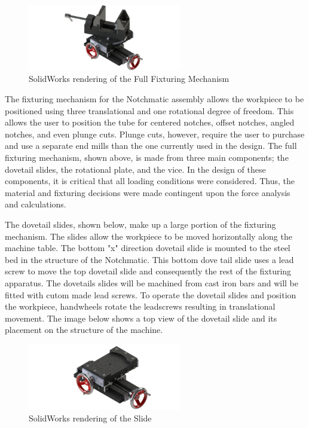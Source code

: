 \begin{figure}[H]
    \centering
    \includegraphics[width=0.6\textwidth]{./images/Chapter2-MachineDescription/Fixturing}
    \caption{SolidWorks rendering of the Full Fixturing Mechanism}
    \label{fig:Electrical:Fixturing}
\end{figure}

The fixturing mechanism for the Notchmatic assembly allows the workpiece to be positioned using three translational and one rotational degree of freedom. This allows the user to position the tube for centered notches, offset notches, angled notches, and even plunge cuts. Plunge cuts, however, require the user to purchase and use a separate end mills than the one currently used in the design. The full fixturing mechanism, shown above, is made from three main components; the dovetail slides, the rotational plate, and the vice. In the design of these components, it is critical that all loading conditions were considered. Thus, the material and fixturing decisions were made contingent upon the force analysis and calculations. 

The dovetail slides, shown below, make up a large portion of the fixturing mechanism. The slides allow the workpiece to be moved horizontally along the machine table. The bottom "x" direction dovetail slide is mounted to the steel bed in the structure of the Notchmatic. This bottom dove tail slide uses a lead screw to move the top dovetail slide and consequently the rest of the fixturing apparatus. The dovetails slides will be machined from cast iron bars and will be fitted with cutom made lead screws. To operate the dovetail slides and position the workpiece, handwheels rotate the leadscrews resulting in translational movement. The image below shows a top view of the dovetail slide and its placement on the structure of the machine. 

\begin{figure}[H]
    \centering
    \includegraphics[width=0.6\textwidth]{./images/Chapter2-MachineDescription/Slide}
    \caption{SolidWorks rendering of the Slide}
    \label{fig:Electrical:Slide}
\end{figure}

